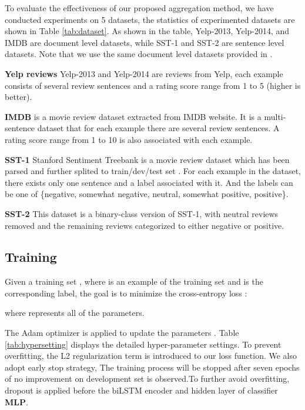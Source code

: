 \documentclass[11pt]{article}
\begin{document}
  To evaluate the effectiveness of our proposed aggregation method, we have conducted experiments on 5 datasets, the statistics of experimented datasets are shown in Table \ref{tab:dataset}. As shown in the table, Yelp-2013, Yelp-2014, and IMDB are document level datasets, while SST-1 and SST-2 are sentence level datasets. Note that we use the same document level datasets provided in \cite{tang2015learning}.




\textbf{Yelp reviews} Yelp-2013 and Yelp-2014 are reviews from Yelp, each example consists of several review sentences and a rating score range from 1 to 5 (higher is better).

\textbf{IMDB} is a movie review dataset extracted from IMDB website. It is a multi-sentence dataset that for each example there are several review sentences. A rating score range from 1 to 10 is also associated with each example.


\textbf{SST-1} Stanford Sentiment Treebank is a movie review dataset which has been parsed and further splited to train/dev/test set \cite{socher2013recursive}. For each example in the dataset, there exists only one sentence and a label associated with it. And the labels can be one of \{negative, somewhat negative, neutral, somewhat positive, positive\}.


\textbf{SST-2} This dataset is a binary-class version of SST-1, with neutral reviews removed and the remaining reviews categorized to either negative or positive.




\subsection{Training}

Given a training set , where  is an example of the training set and  is the corresponding label, the goal is to minimize the cross-entropy loss :

where  represents all of the parameters.

The Adam optimizer is applied to update the parameters \cite{kingma2014adam}. Table \ref{tab:hypersetting} displays the detailed hyper-parameter settings. To prevent overfitting,  the L2 regularization term is introduced to our loss function.
 We also adopt early stop strategy, The training process will be stopped after seven epochs of no improvement on development set is observed.To further avoid overfitting, dropout is applied before the biLSTM encoder and hidden layer of classifier \textbf{MLP}.
\end{document}

